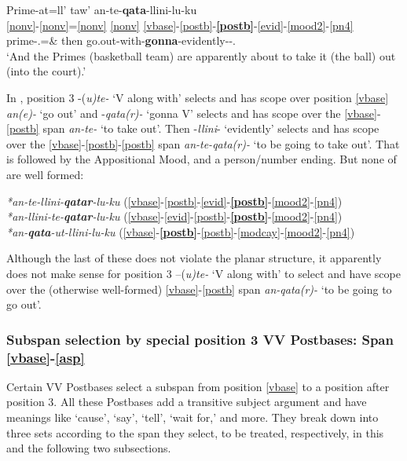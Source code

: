 \documentclass[output=paper]{langscibook}
\begin{document}
\ea\label{ex:key:33}
\glll Prime-at=ll' taw' an-te-\textbf{qata}{}-llini-lu-ku\\
    \ref{nonv}-\ref{nonv}=\ref{nonv} \ref{nonv} \ref{vbase}-\ref{postb}-\textbf{\ref{postb}}{}-\ref{evid}-\ref{mood2}-\ref{pn4}\\
     prime-\Abs.\Pl{}=\& then go.out-with-\textbf{gonna}{}-evidently-\Appos-\Tsg.\Obj{}\\
\glt  `And the Primes (basketball team) are apparently about to take it (the ball) out (into the court).'
\z

In , position 3 -(\textit{u)te-} `V along with' selects and has scope over position \ref{vbase} \textit{an(e)-} `go out' and -\textit{qata(r)-} `gonna V' selects and has scope over the \ref{vbase}-\ref{postb} span \textit{an-te-} `to take out'. Then -\textit{llini}{}- `evidently' selects and has scope over the \ref{vbase}-\ref{postb}-\ref{postb} span \textit{an-te-qata(r)-} `to be going to take out'. That is followed by the Appositional Mood, and a person/number ending. But none of  are well formed:

\ea\label{ex:key:34}
 \textit{*an-te-llini-\textbf{qatar}{}-lu-ku} \textup{(\ref{vbase}-\ref{postb}-\ref{evid}-}\textbf{\textup{\ref{postb}}}\textup{{}-\ref{mood2}-\ref{pn4})}\\
     \textit{*an-llini-te-}\textbf{\textit{qatar}}\textit{{}-lu-ku} (\ref{vbase}-\ref{evid}-\ref{postb}-\textbf{\ref{postb}}{}-\ref{mood2}-\ref{pn4})\\
\textit{*an-\textbf{qata}{}-ut-llini-lu-ku} (\ref{vbase}-\textbf{\ref{postb}}{}-\ref{postb}-\ref{modcay}-\ref{mood2}-\ref{pn4})
\z

Although the last of these does not violate the planar structure, it apparently does not make sense for position 3 –(\textit{u)te-} `V along with' to select and have scope over the (otherwise well-formed) \ref{vbase}-\ref{postb} span \textit{an-qata(r)-} `to be going to go out'.


\subsubsection{Subspan selection by special position 3 VV Postbases: Span \ref{vbase}-\ref{asp}} \label{sec:5.6.2}

Certain VV Postbases select a subspan from position \ref{vbase} to a position after position 3. All these Postbases add a transitive subject argument and have meanings like `cause', `say', `tell', `wait for,' and more. They break down into three sets according to the span they select, to be treated, respectively, in this and the following two subsections.
\end{document}
